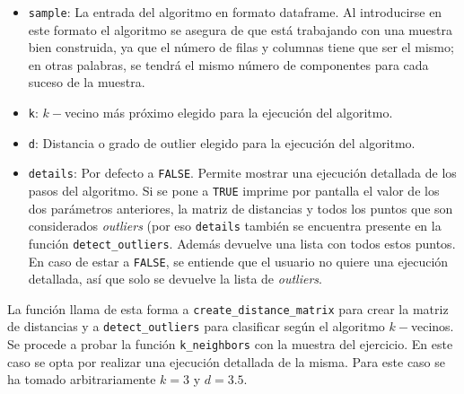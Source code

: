 \documentclass[12pt]{report}\usepackage[]{graphicx}\usepackage[dvipsnames]{xcolor}
\begin{document}
					\begin{itemize}
						\item \texttt{sample}: La entrada del algoritmo en formato dataframe. Al introducirse en este formato el algoritmo se asegura de que está trabajando con una muestra bien construida, ya que el número de filas y columnas tiene que ser el mismo; en otras palabras, se tendrá el mismo número de componentes para cada suceso de la muestra.
						\item \texttt{k}: $k-$vecino más próximo elegido para la ejecución del algoritmo.
						\item \texttt{d}: Distancia o grado de outlier elegido para la ejecución del algoritmo.
						\item \texttt{details}: Por defecto a \texttt{FALSE}. Permite mostrar una ejecución detallada de los pasos del algoritmo. Si se pone a \texttt{TRUE} imprime por pantalla el valor de los dos parámetros anteriores, la matriz de distancias y todos los puntos que son considerados \textit{outliers} (por eso \texttt{details} también se encuentra presente en la función \texttt{detect\_outliers}. Además devuelve una lista con todos estos puntos. En caso de estar a \texttt{FALSE}, se entiende que el usuario no quiere una ejecución detallada, así que solo se devuelve la lista de \textit{outliers}.
					\end{itemize}
					
					La función llama de esta forma a \texttt{create\_distance\_matrix} para crear la matriz de distancias y a \texttt{detect\_outliers} para clasificar según el algoritmo $k-$vecinos.\\
					
					Se procede a probar la función \texttt{k\_neighbors} con la muestra del ejercicio. En este caso se opta por realizar una ejecución detallada de la misma. Para este caso se ha tomado arbitrariamente $k = 3$ y $d = 3.5$. 
					
\end{document}
